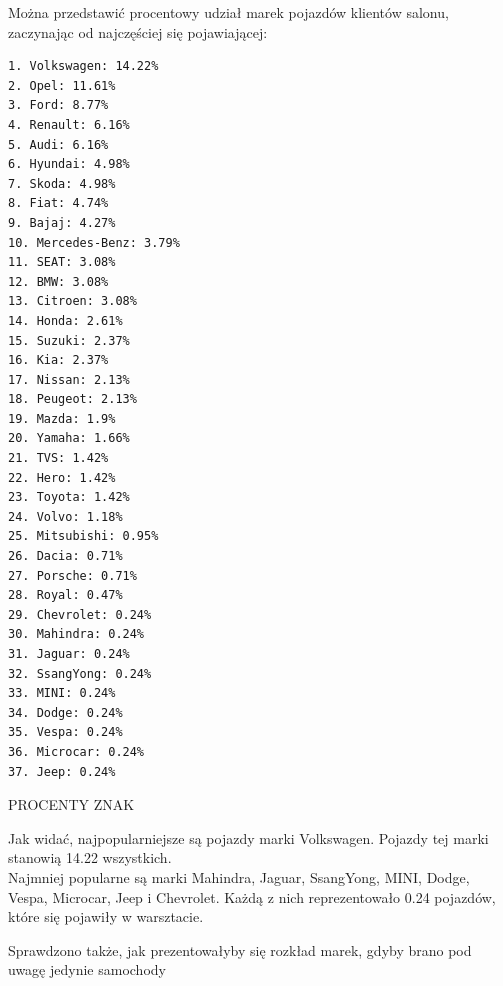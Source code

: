 \documentclass{article}\usepackage[]{graphicx}\usepackage[]{xcolor}
\begin{document}
Można przedstawić procentowy udział marek pojazdów klientów salonu, zaczynając od najczęściej się pojawiającej:

\begin{verbatim}
1. Volkswagen: 14.22%
2. Opel: 11.61%
3. Ford: 8.77%
4. Renault: 6.16%
5. Audi: 6.16%
6. Hyundai: 4.98%
7. Skoda: 4.98%
8. Fiat: 4.74%
9. Bajaj: 4.27%
10. Mercedes-Benz: 3.79%
11. SEAT: 3.08%
12. BMW: 3.08%
13. Citroen: 3.08%
14. Honda: 2.61%
15. Suzuki: 2.37%
16. Kia: 2.37%
17. Nissan: 2.13%
18. Peugeot: 2.13%
19. Mazda: 1.9%
20. Yamaha: 1.66%
21. TVS: 1.42%
22. Hero: 1.42%
23. Toyota: 1.42%
24. Volvo: 1.18%
25. Mitsubishi: 0.95%
26. Dacia: 0.71%
27. Porsche: 0.71%
28. Royal: 0.47%
29. Chevrolet: 0.24%
30. Mahindra: 0.24%
31. Jaguar: 0.24%
32. SsangYong: 0.24%
33. MINI: 0.24%
34. Dodge: 0.24%
35. Vespa: 0.24%
36. Microcar: 0.24%
37. Jeep: 0.24%
\end{verbatim}

{\color{red} PROCENTY ZNAK}

Jak widać, najpopularniejsze są pojazdy marki Volkswagen. Pojazdy tej marki stanowią 14.22 wszystkich. \\

Najmniej popularne są marki Mahindra, Jaguar, SsangYong, MINI, Dodge, Vespa, Microcar, Jeep i Chevrolet. Każdą z nich reprezentowało 0.24 pojazdów, które się pojawiły w warsztacie.

Sprawdzono także, jak prezentowałyby się rozkład marek, gdyby brano pod uwagę jedynie samochody
\end{document}
